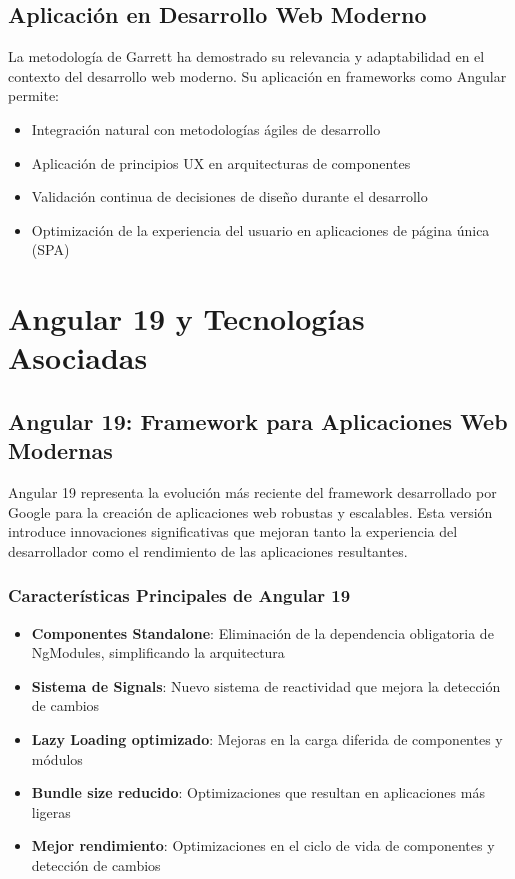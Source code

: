 \subsection{Aplicación en Desarrollo Web Moderno}

La metodología de Garrett ha demostrado su relevancia y adaptabilidad en el contexto del desarrollo web moderno. Su aplicación en frameworks como Angular permite:

\begin{itemize}
    \item Integración natural con metodologías ágiles de desarrollo
    \item Aplicación de principios UX en arquitecturas de componentes
    \item Validación continua de decisiones de diseño durante el desarrollo
    \item Optimización de la experiencia del usuario en aplicaciones de página única (SPA)
\end{itemize}

\section{Angular 19 y Tecnologías Asociadas}

\subsection{Angular 19: Framework para Aplicaciones Web Modernas}

Angular 19 representa la evolución más reciente del framework desarrollado por Google para la creación de aplicaciones web robustas y escalables. Esta versión introduce innovaciones significativas que mejoran tanto la experiencia del desarrollador como el rendimiento de las aplicaciones resultantes.

\subsubsection{Características Principales de Angular 19}

\begin{itemize}
    \item \textbf{Componentes Standalone}: Eliminación de la dependencia obligatoria de NgModules, simplificando la arquitectura
    \item \textbf{Sistema de Signals}: Nuevo sistema de reactividad que mejora la detección de cambios
    \item \textbf{Lazy Loading optimizado}: Mejoras en la carga diferida de componentes y módulos
    \item \textbf{Bundle size reducido}: Optimizaciones que resultan en aplicaciones más ligeras
    \item \textbf{Mejor rendimiento}: Optimizaciones en el ciclo de vida de componentes y detección de cambios
\end{itemize}

